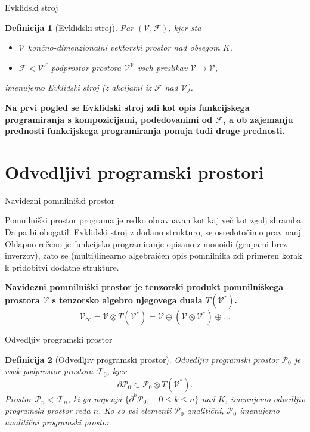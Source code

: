 \documentclass{beamer}
\newcommand{\VV}{\mathcal{V}}
\newcommand{\F}{\mathcal{F}}
\newcommand{\dP}{\mathcal{P}}
\newcommand{\D}{\partial}
\newtheorem{definicija}{Definicija}[section]
\begin{document}
\begin{frame}{Evklidski stroj}

\begin{definicija}[Evklidski stroj]
Par $(\VV,\F)$, kjer sta
\begin{itemize}
\item
$\VV$ končno-dimenzionalni vektorski prostor nad obsegom $K$,
\item
$\F<\VV^\VV$ podprostor prostora $\VV^\VV$ vseh preslikav $\VV\to\VV$,
\end{itemize}
imenujemo \emph{Evklidski stroj} (z akcijami iz $\F$ nad $\VV$).
\end{definicija}

\textbf{Na prvi pogled se Evklidski stroj zdi kot opis funkcijskega programiranja s kompozicijami, podedovanimi od $\F$, a ob zajemanju prednosti funkcijskega programiranja ponuja tudi druge prednosti.}
\end{frame}

\section{Odvedljivi programski prostori}

\begin{frame}{Navidezni pomnilniški prostor}

Pomnilniški prostor programa je redko obravnavan kot kaj več kot zgolj shramba. Da pa bi obogatili Evklidski stroj z dodano strukturo, se osredotočimo prav nanj. Ohlapno rečeno je funkcijsko programiranje opisano z monoidi (grupami brez inverzov), zato se (multi)linearno algebraičen opis pomnilnika zdi primeren korak k pridobitvi dodatne strukture.

\textbf{Navidezni pomnilniški prostor je tenzorski produkt pomnilniškega prostora $\VV$ s tenzorsko algebro njegovega duala $T(\VV^*)$.}
\begin{equation*}
\VV_\infty = \VV\otimes T(\VV^*) = \VV\oplus
(\VV\otimes\VV^*)\oplus\ldots\label{eq:virtual-memory}
\end{equation*}

\end{frame}

\begin{frame}{Odvedljiv programski prostor}
\begin{definicija}[Odvedljiv programski prostor]
\emph{Odvedljiv programski prostor} $\dP_0$ je vsak podprostor prostora $\F_0$, kjer
\begin{equation*}\label{eq:P}
 	\D\dP_0\subset\dP_0\otimes T(\VV^*).
\end{equation*}
Prostor $\dP_n<\F_n$, ki ga napenja $\{\D^k\dP_0;\quad 0\le k\le n\}$ nad $K$, imenujemo \emph{odvedljiv programski prostor reda} $n$. Ko so vsi elementi $\dP_0$ analitični, $\dP_0$ imenujemo \emph{analitični programski prostor}. 
\end{definicija}
\end{frame}
\end{document}
